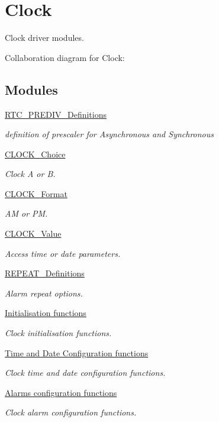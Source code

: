 \hypertarget{group___clock}{}\section{Clock}
\label{group___clock}


Clock driver modules.  


Collaboration diagram for Clock\+:
\subsection*{Modules}
\begin{DoxyCompactItemize}
\item 
\hyperlink{group___r_t_c___p_r_e_d_i_v___definitions}{R\+T\+C\+\_\+\+P\+R\+E\+D\+I\+V\+\_\+\+Definitions}
\begin{DoxyCompactList}\small\item\em definition of prescaler for Asynchronous and Synchronous \end{DoxyCompactList}\item 
\hyperlink{group___c_l_o_c_k___choice}{C\+L\+O\+C\+K\+\_\+\+Choice}
\begin{DoxyCompactList}\small\item\em Clock A or B. \end{DoxyCompactList}\item 
\hyperlink{group___c_l_o_c_k___format}{C\+L\+O\+C\+K\+\_\+\+Format}
\begin{DoxyCompactList}\small\item\em AM or PM. \end{DoxyCompactList}\item 
\hyperlink{group___c_l_o_c_k___value}{C\+L\+O\+C\+K\+\_\+\+Value}
\begin{DoxyCompactList}\small\item\em Access time or date parameters. \end{DoxyCompactList}\item 
\hyperlink{group___r_e_p_e_a_t___definitions}{R\+E\+P\+E\+A\+T\+\_\+\+Definitions}
\begin{DoxyCompactList}\small\item\em Alarm repeat options. \end{DoxyCompactList}\item 
\hyperlink{group___clock___init}{Initialisation functions}
\begin{DoxyCompactList}\small\item\em Clock initialisation functions. \end{DoxyCompactList}\item 
\hyperlink{group___clock___time___date}{Time and Date Configuration functions}
\begin{DoxyCompactList}\small\item\em Clock time and date configuration functions. \end{DoxyCompactList}\item 
\hyperlink{group___clock___alarms}{Alarms configuration functions}
\begin{DoxyCompactList}\small\item\em Clock alarm configuration functions. \end{DoxyCompactList}\end{DoxyCompactItemize}
